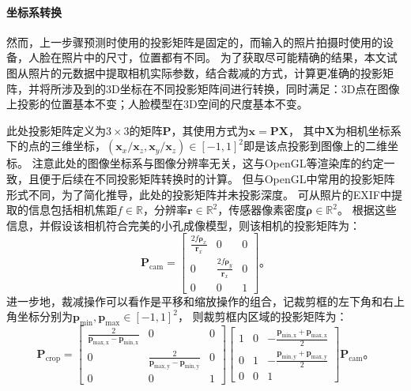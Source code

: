 \paragraph{坐标系转换}
然而，上一步骤预测时使用的投影矩阵是固定的，而输入的照片拍摄时使用的设备，人脸在照片中的尺寸，位置都有不同。
为了获取尽可能精确的结果，本文试图从照片的元数据中提取相机实际参数，结合裁减的方式，计算更准确的投影矩阵，并将所涉及到的3D坐标在不同投影矩阵间进行转换，同时满足：3D点在图像上投影的位置基本不变；人脸模型在3D空间的尺度基本不变。

此处投影矩阵定义为$3\times 3$的矩阵$\mathbf{P}$，其使用方式为$\mathbf{x} = \mathbf{P}\mathbf{X}$，
其中$\mathbf{X}$为相机坐标系下的点的三维坐标，$(\mathbf{x}_x/\mathbf{x}_z,\mathbf{x}_y/\mathbf{x}_z)\in[-1,1]^2$即是该点投影到图像上的二维坐标。
注意此处的图像坐标系与图像分辨率无关，这与OpenGL等渲染库的约定一致，且便于后续在不同投影矩阵转换时的计算。
但与OpenGL中常用的投影矩阵形式不同，为了简化推导，此处的投影矩阵并未投影深度。
可从照片的EXIF中提取的信息包括相机焦距$f\in\mathbb{R}$，分辨率$\mathbf{r}\in\mathbb{R}^2$，传感器像素密度$\mathbf{\rho}\in\mathbb{R}^2$。
根据这些信息，并假设该相机符合完美的小孔成像模型，则该相机的投影矩阵为：
\begin{equation}
    \mathbf{P}_\mathrm{cam} = \begin{bmatrix}
        \frac{2f\mathbf{\rho}_x}{\mathbf{r}_x} & 0 & 0 \\
        0 & \frac{2f\mathbf{\rho}_y}{\mathbf{r}_x} & 0 \\
        0 & 0 & 1
    \end{bmatrix}
    \text{。}
\end{equation}
进一步地，裁减操作可以看作是平移和缩放操作的组合，记裁剪框的左下角和右上角坐标分别为$\mathbf{p}_\mathrm{min},\mathbf{p}_\mathrm{max}\in[-1,1]^2$，
则裁剪框内区域的投影矩阵为：
\begin{equation}
    \mathbf{P}_\mathrm{crop} = \begin{bmatrix}
        \frac{2}{\mathbf{p}_\mathrm{max,x}-\mathbf{p}_\mathrm{min,x}} & 0 & 0 \\
        0 & \frac{2}{\mathbf{p}_\mathrm{max,y}-\mathbf{p}_\mathrm{min,y}} & 0 \\
        0 & 0 & 1
    \end{bmatrix}\begin{bmatrix}
        1 & 0 & -\frac{\mathbf{p}_\mathrm{min,x}+\mathbf{p}_\mathrm{max,x}}{2} \\
        0 & 1 & -\frac{\mathbf{p}_\mathrm{min,y}+\mathbf{p}_\mathrm{max,y}}{2} \\
        0 & 0 & 1
    \end{bmatrix}\mathbf{P}_\mathrm{cam}
    \text{。}
\end{equation}

